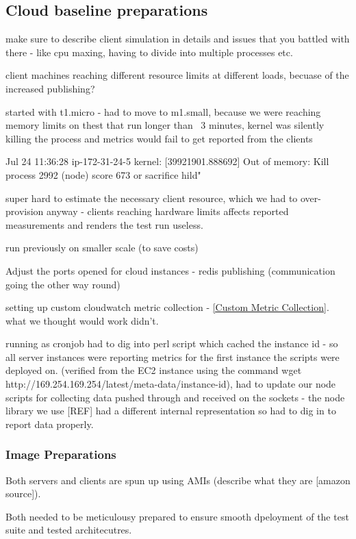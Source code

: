 \documentclass{uvamscse}
\begin{document}
\subsection{Cloud baseline preparations}

make sure to describe client simulation in details and issues that you battled with there - like cpu maxing, having to divide into multiple processes etc.

client machines reaching different resource limits at different loads, becuase of the increased publishing?

started with t1.micro - had to move to m1.small, because we were reaching memory limits on thest that run longer than ~3 minutes, kernel was silently killing the process and metrics would fail to get reported from the clients

Jul 24 11:36:28 ip-172-31-24-5 kernel: [39921901.888692] Out of memory: Kill process 2992 (node) score 673 or sacrifice hild"

super hard to estimate the necessary client resource, which we had to over-provision anyway - clients reaching hardware limits affects reported measurements and renders the test run useless.

run previously on smaller scale (to save costs)

Adjust the ports opened for cloud instances - redis publishing (communication going the other way round)

setting up custom cloudwatch metric collection - \ref{Custom Metric Collection}. what we thought would work didn't.

running as cronjob
had to dig into perl script which cached the instance id - so all server instances were reporting metrics for the first instance the scripts were deployed on. (verified from the EC2 instance using the command wget http://169.254.169.254/latest/meta-data/instance-id),
had to update our node scripts for collecting data pushed through and received on the sockets - the node library we use [REF] had a different internal representation so had to dig in to report data properly.

\subsubsection{Image Preparations}
Both servers and clients are spun up using AMIs (describe what they are [amazon source]).

Both needed to be meticulousy prepared to ensure smooth dpeloyment of the test suite and tested architecutres.
\end{document}
